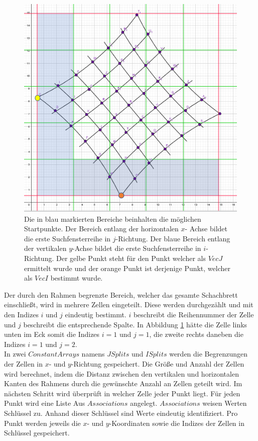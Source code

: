 \begin{figure}[!htb]
	\centering
	\includegraphics[width=0.6\linewidth]{images/VerzeichnetesSchachbrett_1.png}
	\caption[Startpunktsuche in Schachbretteckpunkten]{Die in blau markierten Bereiche beinhalten die möglichen Startpunkte. Der Bereich entlang der horizontalen $x$- Achse bildet die erste Suchfensterreihe in $j$-Richtung. Der blaue Bereich entlang der vertikalen $y$-Achse bildet die erste Suchfensterreihe in $i$-Richtung. Der gelbe Punkt steht für den Punkt welcher als $VecJ$ ermittelt wurde und der orange Punkt ist derjenige Punkt, welcher als $VecI$ bestimmt wurde.}
	\label{fig:7.1}
\end{figure}

Der durch den Rahmen begrenzte Bereich, welcher das gesamte Schachbrett einschließt, wird in mehrere Zellen eingeteilt. Diese werden durchgezählt und mit den Indizes $i$ und $j$ eindeutig bestimmt. $i$ beschreibt die Reihennummer der Zelle und $j$ beschreibt die entsprechende Spalte. In Abbildung \ref{fig:7.1} hätte die Zelle links unten im Eck somit die Indizes $i = 1$ und $j = 1$, die zweite rechts daneben die Indizes $i = 1$ und $j= 2$.\\

In zwei $ConstantArrays$ namens $JSplits$ und $ISplits$ werden die Begrenzungen der Zellen  in $x$- und $y$-Richtung gespeichert. Die Größe und Anzahl der Zellen wird berechnet, indem die Distanz zwischen den vertikalen und horizontalen Kanten des Rahmens durch die gewünschte Anzahl an Zellen geteilt wird. Im nächsten Schritt wird überprüft in welcher Zelle jeder Punkt liegt. Für jeden Punkt wird eine Liste Aus $Associations$ angelegt.  $Associations$ weisen Werten Schlüssel zu. Anhand dieser Schlüssel sind Werte eindeutig identifiziert\cite{Mathematica}. Pro Punkt werden jeweils die $x$- und $y$-Koordinaten sowie die Indizes der Zellen in Schlüssel gespeichert.

